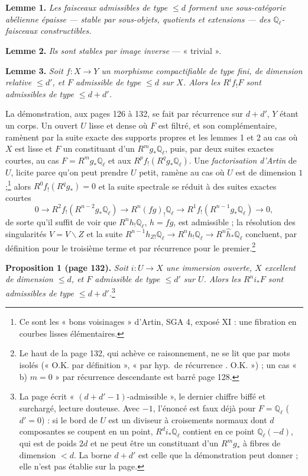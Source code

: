 \documentclass[11pt,a4paper]{article}
\begin{document}
\textbf{Lemme 1.} \emph{Les faisceaux admissibles de type $\leqslant d$ forment une
sous-catégorie abélienne épaisse --- stable par sous-objets, quotients et
extensions --- des $\mathbb{Q}_{\ell}$-faisceaux constructibles.}

\textbf{Lemme 2.} \emph{Ils sont stables par image inverse} --- « trivial ».

\textbf{Lemme 3.} \emph{Soit $f \colon X \to Y$ un morphisme compactifiable de type
fini, de dimension relative $\leqslant d'$, et $F$ admissible de type $\leqslant d$
sur $X$. Alors les $R^{i}f_{!}F$ sont admissibles de type $\leqslant d + d'$.}

La démonstration, aux pages 126 à 132, se fait par récurrence sur $d + d'$, $Y$
étant un corps. Un ouvert $U$ lisse et dense où $F$ est filtré, et son
complémentaire, ramènent par la suite exacte des supports propres et les lemmes
1 et 2 au cas où $X$ est lisse et $F$ un constituant d'un $R^{m}g_{*}\mathbb{Q}_{\ell}$,
puis, par deux suites exactes courtes, au cas $F = R^{m}g_{*}\mathbb{Q}_{\ell}$ et aux
$R^{p}f_{!}(R^{q}g_{*}\mathbb{Q}_{\ell})$. Une \emph{factorisation d'Artin} de $U$,
licite parce qu'on peut prendre $U$ petit, ramène au cas où $U$ est de dimension
$1$ ;\footnote{Ce sont les « bons voisinages » d'Artin, SGA 4, exposé XI : une
fibration en courbes lisses élémentaires.} alors $R^{0}f_{!}(R^{q}g_{*}) = 0$ et la
suite spectrale se réduit à des suites exactes courtes
\[
0 \to R^{2}f_{!}(R^{n-2}g_{*}\mathbb{Q}_{\ell}) \to R^{n}(fg)_{!}\mathbb{Q}_{\ell} \to
R^{1}f_{!}(R^{n-1}g_{*}\mathbb{Q}_{\ell}) \to 0 ,
\]
de sorte qu'il suffit de voir que $R^{n}h_{!}\mathbb{Q}_{\ell}$, $h = fg$, est
admissible ; la résolution des singularités $V = \widehat{V} \smallsetminus Z$ et la
suite $R^{n-1}h_{Z!}\mathbb{Q}_{\ell} \to R^{n}h_{!}\mathbb{Q}_{\ell} \to
R^{n}\hat{h}_{*}\mathbb{Q}_{\ell}$ concluent, par définition pour le troisième terme et
par récurrence pour le premier.\footnote{Le haut de la page 132, qui achève ce
raisonnement, ne se lit que par mots isolés (« O.K. par définition », « par hyp.\ de récurrence
. O.K. ») ; un cas « b) $m = 0$ » par récurrence descendante est
barré page 128.}

\textbf{Proposition 1 (page 132).} \emph{Soit $i \colon U \to X$ une immersion
ouverte, $X$ excellent de dimension $\leqslant d$, et $F$ admissible de type
$\leqslant d'$ sur $U$. Alors les $R^{n}i_{*}F$ sont admissibles de type $\leqslant
d + d'$.}\footnote{La page écrit « $(d+d'-1)$-admissible », le dernier chiffre biffé
et surchargé, lecture douteuse. Avec $-1$, l'énoncé est faux déjà pour $F =
\mathbb{Q}_{\ell}$ ($d' = 0$) : si le bord de $U$ est un diviseur à croisements
normaux dont $d$ composantes se coupent en un point, $R^{d}i_{*}\mathbb{Q}_{\ell}$
contient en ce point $\mathbb{Q}_{\ell}(-d)$, qui est de poids $2d$ et ne peut être
un constituant d'un $R^{m}g_{*}$ à fibres de dimension $< d$. La borne $d + d'$ est
celle que la démonstration peut donner ; elle n'est pas établie sur la page.}
\end{document}
